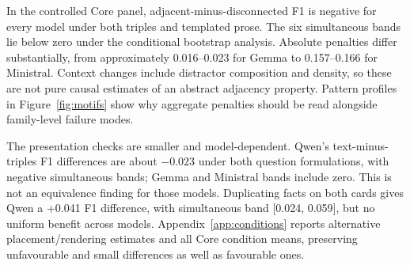 In the controlled Core panel, adjacent-minus-disconnected F1 is negative for every model under both triples and templated prose. The six simultaneous bands lie below zero under the conditional bootstrap analysis. Absolute penalties differ substantially, from approximately 0.016--0.023 for Gemma to 0.157--0.166 for Ministral. Context changes include distractor composition and density, so these are not pure causal estimates of an abstract adjacency property. Pattern profiles in Figure~\ref{fig:motifs} show why aggregate penalties should be read alongside family-level failure modes.

The presentation checks are smaller and model-dependent. Qwen's text-minus-triples F1 differences are about $-0.023$ under both question formulations, with negative simultaneous bands; Gemma and Ministral bands include zero. This is not an equivalence finding for those models. Duplicating facts on both cards gives Qwen a +0.041 F1 difference, with simultaneous band [0.024, 0.059], but no uniform benefit across models. Appendix~\ref{app:conditions} reports alternative placement/rendering estimates and all Core condition means, preserving unfavourable and small differences as well as favourable ones.
